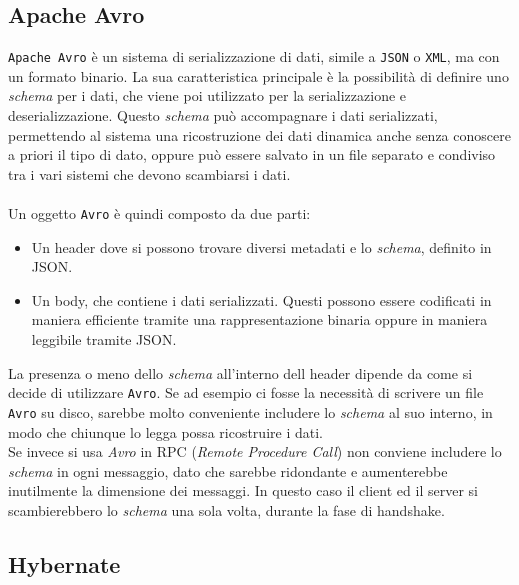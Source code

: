 \subsection{Apache Avro}
\label{subsec:avro_overview}
\texttt{Apache Avro} è un sistema di serializzazione di dati, simile a \texttt{JSON} o \texttt{XML}, ma con un formato binario.
La sua caratteristica principale è la possibilità di definire uno \textit{schema} per i dati, che viene poi utilizzato per la serializzazione e deserializzazione.
Questo \textit{schema} può accompagnare i dati serializzati, permettendo al sistema una ricostruzione dei dati dinamica anche senza conoscere a priori il tipo di dato,
oppure può essere salvato in un file separato e condiviso tra i vari sistemi che devono scambiarsi i dati.\\\\

Un oggetto \texttt{Avro} è quindi composto da due parti: 
\begin{itemize}
    \item Un header dove si possono trovare diversi metadati e lo \textit{schema}, definito in JSON.
    \item Un body, che contiene i dati serializzati.
    Questi possono essere codificati in maniera efficiente tramite una rappresentazione binaria oppure in maniera leggibile tramite JSON.
\end{itemize}
La presenza o meno dello \textit{schema} all'interno dell header dipende da come si decide di utilizzare \texttt{Avro}.
Se ad esempio ci fosse la necessità di scrivere un file \texttt{Avro} su disco, sarebbe molto conveniente includere lo \textit{schema} al suo interno,
in modo che chiunque lo legga possa ricostruire i dati.\\
Se invece si usa \textit{Avro} in RPC (\textit{Remote Procedure Call}) non conviene includere lo \textit{schema} in ogni messaggio,
dato che sarebbe ridondante e aumenterebbe inutilmente la dimensione dei messaggi.
In questo caso il client ed il server si scambierebbero lo \textit{schema} una sola volta, durante la fase di handshake.

\subsection{Hybernate}
\label{subsec:hibernate_overview}